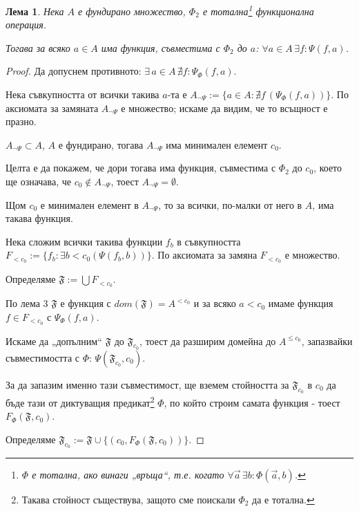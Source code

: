 \documentclass{article}
\newtheorem{lemma}[tlemma]{Лема}
\theoremstyle{definition}
\begin{document}
\begin{multicols}{2}
\begin{lemma}
    Нека $A$ е фундирано множество, $\Phi_2$ е тотална\footnote{$\Phi$ е тотална, ако винаги „връща“, т.е. когато $\forall{\vec{a}}\,\exists{b}: \Phi(\vec{a},b)$.} функционална операция.

    Тогава за всяко $a \in A$ има функция, съвместима с $\Phi_2$ до $a$: $\forall a\in A\,\exists f: \Psi(f,a)$.

\end{lemma}

\begin{proof}
    Да допуснем противното: ${\exists\,a\!\in\!A \, \nexists f: \Psi_\Phi(f,a)}$.

    Нека съвкупността от всички такива $a$-та е
    $A_{\neg{\Psi}}:=\{a\!\in\!A: \nexists f\,(\Psi_\Phi(f,a))\}$.
    По аксиомата за замяната $A_{\neg{\Psi}}$ е множество;
    искаме да видим, че то всъщност е празно.

    $A_{\neg{\Psi}} \subset A$, $A$ е фундирано, тогава $A_{\neg{\Psi}}$ има минимален елемент $c_0$.

    Целта е да покажем, че дори тогава има функция, съвместима с $\Phi_2$ до $c_0$, което ще означава, че $c_0 \notin A_{\neg{\Psi}}$, тоест $A_{\neg{\Psi}} = \emptyset$.

    Щом $c_0$ е минимален елемент в $A_{\neg{\Psi}}$,
    то за всички, по-малки от него в $A$, има такава функция.

    Нека сложим всички такива функции $f_b$ в съвкупността ${F_{<c_0} := \{f_b : \exists b<c_0 (\Psi(f_b, b)) \}}$.
    По аксиомата за замяна $F_{<c_0}$ е множество.

    \columnbreak
    Определяме \(\mathfrak{F} := \bigcup F_{<c_0}\).

    По лема 3 $\mathfrak{F}$ е функция с $dom(\mathfrak{F}) = A^{<c_0}$ и за всяко $a<c_0$ имаме функция $f \in F_{<c_0}$ с $\Psi_\Phi(f,a)$.

    Искаме да „допълним“ $\mathfrak{F}$ до $\mathfrak{F}_{c_0}$, тоест да разширим домейна до $A^{\le c_0}$, запазвайки съвместимостта с $\Phi$: $\Psi(\mathfrak{F}_{c_0}, c_0)$.

    За да запазим именно тази съвместимост, ще вземем стойността за $\mathfrak{F}_{c_0}$ в $c_0$ да бъде тази от диктуващия предикат\footnote{Такава стойност съществува, защото сме поискали $\Phi_2$ да е тотална.} $\Phi$, по който строим самата функция - тоест $F_\Phi(\mathfrak{F}, c_0)$.


    Определяме $\mathfrak{F}_{c_0} := \mathfrak{F} \cup \{(c_0, F_\Phi(\mathfrak{F}, c_0))\}$.


\end{proof}
\end{multicols}
\end{document}
